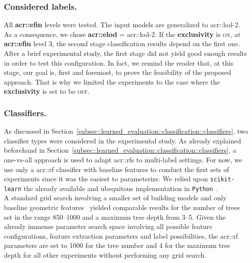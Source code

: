         \subsubsection{Considered labels.}
            All \textbf{\gls{acr::efin}} levels were tested.
            The input models are generalized to \gls{acr::lod}-2.
            As a consequence, we chose \textbf{\gls{acr::elod}} = \gls{acr::lod}-2.
            If the \textbf{exclusivity} is \textsc{on}, at \textbf{\gls{acr::efin}} level 3, the second stage classification results depend on the first one.
            After a brief experimental study, the first stage did not yield good enough results in order to test this configuration.
            In fact, we remind the reader that, at this stage, our goal is, first and foremost, to prove the feasibility of the proposed approach.
            That is why we limited the experiments to the case where the \textbf{exclusivity} is set to be \textsc{off}.

        \subsubsection{Classifiers.}
            As discussed in Section~\ref{subsec::learned_evaluation::classification::classifiers}, two classifier types were considered in the experimental study.
            As already explained beforehand in Section~\ref{subsec::learned_evaluation::classification::classifiers}, a one-vs-all approach is used to adapt \glspl{acr::rf} to multi-label settings.
            For now, we use only a \gls{acr::rf} classifier with baseline features to conduct the first sets of experiments since it was the easiest to parameterize.
            We relied upon \verb!scikit-learn! the already available and ubequitous implementation in \verb!Python!~\parencite{scikit-learn}.\\
            
            A standard grid search involving a smaller set of building models and only baseline geometric features~\parencite{ennafii2018qualificationunannotated} yielded comparable results for the number of trees set in the range \numrange{850}{1000} and a maximum tree depth from \numrange{3}{5}.
            Given the already immense parameter search space involving all possible feature configurations, feature extraction parameters and label possibilities, the \gls{acr::rf} parameters are set to \num{1000} for the tree number and 4 for the maximum tree depth for all other experiments without performing any grid search.
    
